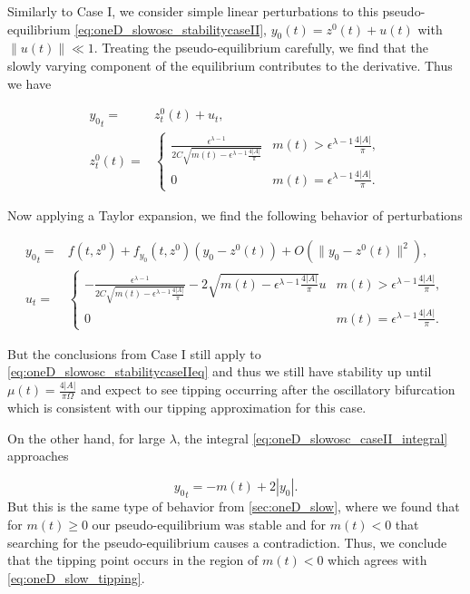 Similarly to Case I, we consider simple linear perturbations to this pseudo-equilibrium \eqref{eq:oneD_slowosc_stabilitycaseII}, $y_0(t)=z^0(t)+u(t)$ with $\lVert u(t) \rVert \ll 1$. Treating the pseudo-equilibrium carefully, we find that the slowly varying component of the equilibrium contributes to the derivative. Thus we have

\begin{equation}
\begin{aligned}
{y_0}_t =& z^0_t(t) +u_t,\\
z^0_t(t) = & \begin{cases}
\frac{\epsilon^{\lambda-1}}{2C\sqrt{m(t)-\epsilon^{\lambda-1}\frac{4|A|}{\pi}}} & m(t)> \epsilon^{\lambda-1}\frac{4|A|}{\pi},\\
0 & m(t) =\epsilon^{\lambda-1}\frac{4|A|}{\pi}.
\end{cases}
\end{aligned}
\end{equation}

Now applying a Taylor expansion, we find the following behavior of perturbations

\begin{equation}\label{eq:oneD_slowosc_stabilitycaseIIeq}
\begin{aligned}
{y_0}_t =& f(t,z^0)+f_{y_0}(t,z^0)(y_0-z^0(t))+O(\lVert y_0-z^0(t) \rVert^2),\\
u_t =&\begin{cases}
-\frac{\epsilon^{\lambda-1}}{2C\sqrt{m(t)-\epsilon^{\lambda-1}\frac{4|A|}{\pi}}}-2\sqrt{m(t)-\epsilon^{\lambda-1}\frac{4|A|}{\pi}} u & m(t)>\epsilon^{\lambda-1}\frac{4|A|}{\pi},\\
0 & m(t)=\epsilon^{\lambda-1}\frac{4|A|}{\pi}.
\end{cases}
\end{aligned}
\end{equation}

But the conclusions from Case I still apply to \eqref{eq:oneD_slowosc_stabilitycaseIIeq} and thus we still have stability up until $\mu(t)=\frac{4|A|}{\pi\Omega}$ and expect to see tipping occurring after the oscillatory bifurcation which is consistent with our tipping approximation for this case.

On the other hand, for large $\lambda$, the  integral \eqref{eq:oneD_slowosc_caseII_integral} approaches

\begin{equation}\label{eq:oneD_slowosc_stabilitycaseII}
{y_0}_t=-m(t)+2|y_0|.
\end{equation}
But this is the same type of behavior from \autoref{sec:oneD_slow}, where we found that for $m(t)\ge 0$ our pseudo-equilibrium was stable and for $m(t)<0$ that searching for the pseudo-equilibrium causes a contradiction. Thus, we conclude that the tipping point occurs in the region of $m(t)<0$ which agrees with \eqref{eq:oneD_slow_tipping}.
